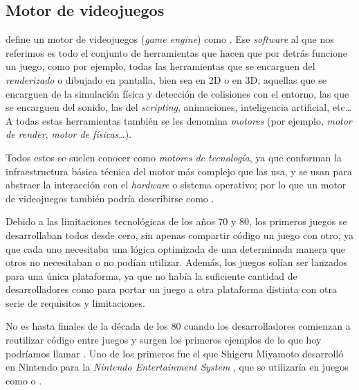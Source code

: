 \subsection{Motor de videojuegos}
\cite{gregory2018game} define un motor de videojuegos (\textit{game engine}) como . Ese \textit{software} al que nos referimos es todo el conjunto de herramientas que hacen que por detrás funcione un juego, como por ejemplo, todas las herramientas que se encarguen del \textit{renderizado} o dibujado en pantalla, bien sea en 2D o en 3D, aquellas que se encarguen de la simulación física y detección de colisiones con el entorno, las que se encarguen del sonido, las del \textit{scripting}, animaciones, inteligencia artificial, etc\ldots A todas estas herramientas también se les denomina \textit{motores} (por ejemplo, \textit{motor de render}, \textit{motor de físicas}\ldots).

\smallskip

Todos estos  se suelen conocer como \textit{motores de tecnología}, ya que conforman la infraestructura básica técnica del motor más complejo que las usa, y se usan para abstraer la interacción con el \textit{hardware} o sistema operativo; por lo que un motor de videojuegos también podría describirse como .

\medskip

Debido a las limitaciones tecnológicas de los años 70 y 80, los primeros juegos se desarrollaban todos desde cero, sin apenas compartir código un juego con otro, ya que cada uno necesitaba una lógica optimizada de una determinada manera que otros no necesitaban o no podían utilizar. Además, los juegos solían ser lanzados para una única plataforma, ya que no había la suficiente cantidad de desarrolladores como para portar un juego a otra plataforma distinta con otra serie de requisitos y limitaciones.

\smallskip

No es hasta finales de la década de los 80 cuando los desarrolladores comienzan a reutilizar código entre juegos y surgen los primeros ejemplos de lo que hoy podríamos llamar . Uno de los primeros fue el que Shigeru Miyamoto desarrolló en Nintendo para la \textit{Nintendo Entertainment System} \citep{williams2017history}, que se utilizaría en juegos como  o .

